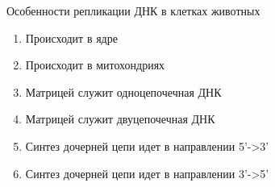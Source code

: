 
Особенности репликации ДНК в
клетках животных

\begin{enumerate}
    \item Происходит в ядре 
    \item Происходит в митохондриях 
    \item Матрицей служит одноцепочечная ДНК 
    \item Матрицей служит двуцепочечная ДНК 
    \item Синтез дочерней цепи идет в направлении 5’->3’
    \item Синтез дочерней цепи идет в направлении 3’->5’
\end{enumerate}


\explanationSection

